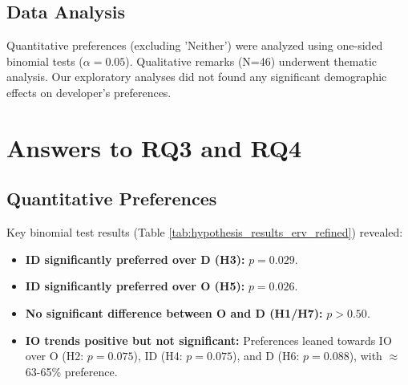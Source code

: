 \documentclass[conference]{IEEEtran}
\begin{document}


\subsection{Data Analysis}
Quantitative preferences (excluding 'Neither') were analyzed using one-sided binomial tests ($\alpha=0.05$). Qualitative remarks (N=46) underwent thematic analysis. Our exploratory analyses did not found any significant demographic effects on developer's preferences.

\section{Answers to RQ3 and RQ4} %
\subsection{Quantitative Preferences}
Key binomial test results (Table \ref{tab:hypothesis_results_erv_refined}) revealed:
\begin{itemize}
    \item \textbf{ID significantly preferred over D (H3):} $p=0.029$.
    \item \textbf{ID significantly preferred over O (H5):} $p=0.026$.
    \item \textbf{No significant difference between O and D (H1/H7):} $p > 0.50$.
    \item \textbf{IO trends positive but not significant:} Preferences leaned towards IO over O (H2: $p=0.075$), ID (H4: $p=0.075$), and D (H6: $p=0.088$), with $\approx$63-65\% preference.
\end{itemize}
\end{document}
